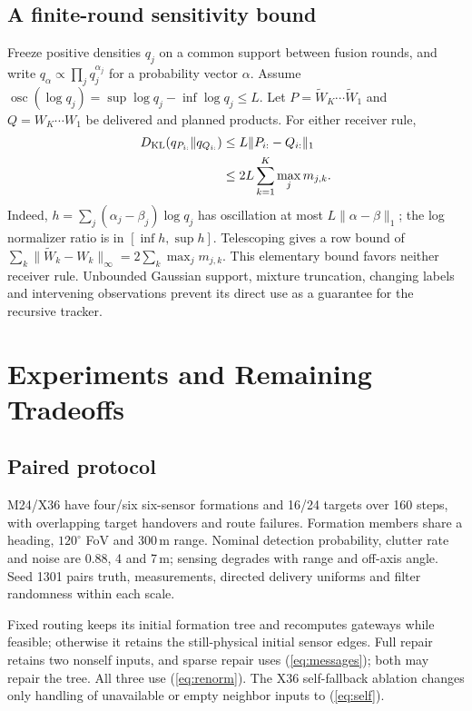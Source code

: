 \documentclass{article}
\newcommand{\osc}{\operatorname{osc}}
\begin{document}
\subsection{A finite-round sensitivity bound}
Freeze positive densities $q_j$ on a common support between fusion rounds,
and write $q_\alpha\propto\prod_jq_j^{\alpha_j}$ for a probability vector
$\alpha$. Assume $\osc(\log q_j)=\sup\log q_j-\inf\log q_j\leq L$.
Let $P=\widetilde W_K\cdots\widetilde W_1$ and $Q=W_K\cdots W_1$ be
delivered and planned products. For either receiver rule,
\begin{align}
 D_{\rm KL}(q_{P_{i:}}\|q_{Q_{i:}})
 &\leq L\|P_{i:}-Q_{i:}\|_1 \nonumber\\
 &\leq 2L\sum_{k=1}^K\max_j m_{j,k}.\label{eq:bound}
\end{align}
Indeed, $h=\sum_j(\alpha_j-\beta_j)\log q_j$ has oscillation at most
$L\|\alpha-\beta\|_1$; the log normalizer ratio is in
$[\inf h,\sup h]$. Telescoping gives a row bound of
$\sum_k\|\widetilde W_k-W_k\|_\infty=2\sum_k\max_jm_{j,k}$.
This elementary bound favors neither receiver rule. Unbounded Gaussian
support, mixture truncation, changing labels and intervening observations
prevent its direct use as a guarantee for the recursive tracker.

\section{Experiments and Remaining Tradeoffs}
\subsection{Paired protocol}
M24/X36 have four/six six-sensor formations and 16/24 targets over 160 steps,
with overlapping target handovers and route failures. Formation members
share a heading, $120^\circ$ FoV and 300\,m range. Nominal detection
probability, clutter rate and noise are 0.88, 4 and 7\,m; sensing degrades
with range and off-axis angle. Seed 1301 pairs truth, measurements, directed
delivery uniforms and filter randomness within each scale.

Fixed routing keeps its initial formation tree and recomputes gateways while
feasible; otherwise it retains the still-physical initial sensor edges.
Full repair retains two nonself inputs, and sparse repair uses
(\ref{eq:messages}); both may repair the tree. All three use
(\ref{eq:renorm}). The X36 self-fallback ablation changes only handling of
unavailable or empty neighbor inputs to (\ref{eq:self}).
\end{document}
